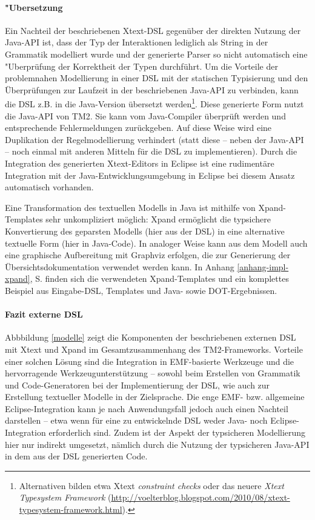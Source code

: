 \documentclass[abstracton, 12pt]{scrartcl}
\begin{document}
\paragraph{"Ubersetzung} \label{section-xpand}

Ein Nachteil der beschriebenen Xtext-DSL gegenüber der direkten Nutzung der Java-API ist, dass der Typ der Interaktionen lediglich als String in der Grammatik modelliert wurde und der generierte Parser so nicht automatisch eine "Uberprüfung der Korrektheit der Typen durchführt. Um die Vorteile der problemnahen Modellierung in einer DSL mit der statischen Typisierung und den Überprüfungen zur Laufzeit in der beschriebenen Java-API zu verbinden, kann die DSL z.B. in die Java-Version übersetzt werden\footnote{Alternativen bilden etwa Xtext \emph{constraint checks} oder das neuere \emph{Xtext Typesystem Framework} (\url{http://voelterblog.blogspot.com/2010/08/xtext-typesystem-framework.html}).}. Diese generierte Form nutzt die Java-API von TM2. Sie kann vom Java-Compiler überprüft werden und entsprechende Fehlermeldungen zurückgeben. Auf diese Weise wird eine Duplikation der Regelmodellierung verhindert (statt diese -- neben der Java-API -- noch einmal mit anderen Mitteln für die DSL zu implementieren). Durch die Integration des generierten Xtext-Editors in Eclipse ist eine rudimentäre Integration mit der Java-Entwicklungsumgebung in Eclipse bei diesem Ansatz automatisch vorhanden.

Eine Transformation des textuellen Modells in Java ist mithilfe von Xpand-Templates sehr unkompliziert möglich: Xpand ermöglicht die typsichere Konvertierung des geparsten Modells (hier aus der DSL) in eine alternative textuelle Form (hier in Java-Code). In analoger Weise kann aus dem Modell auch eine graphische Aufbereitung mit Graphviz erfolgen, die zur Generierung der Übersichtsdokumentation verwendet werden kann. In Anhang \ref{anhang-impl-xpand}, S. \pageref{anhang-impl-xpand} finden sich die verwendeten Xpand-Templates und ein komplettes Beispiel aus Eingabe-DSL, Templates und Java- sowie DOT-Ergebnissen. 

\paragraph{Fazit externe DSL}

Abbbildung \ref{modelle} zeigt die Komponenten der beschriebenen externen DSL mit Xtext und Xpand im Gesamtzusammenhang des TM2-Frameworks. Vorteile einer solchen Lösung sind die Integration in EMF-basierte Werkzeuge und die hervorragende Werkzeugunterstützung -- sowohl beim Erstellen von Grammatik und Code-Generatoren bei der Implementierung der DSL, wie auch zur Erstellung textueller Modelle in der Zielsprache. Die enge EMF- bzw. allgemeine Eclipse-In\-te\-gra\-tion kann je nach Anwendungsfall jedoch auch einen Nachteil darstellen -- etwa wenn für eine zu entwickelnde DSL weder Java- noch Eclipse-Integration erforderlich sind. Zudem ist der Aspekt der typsicheren Modellierung hier nur indirekt umgesetzt, nämlich durch die Nutzung der typsicheren Java-API in dem aus der DSL generierten Code.
\end{document}
